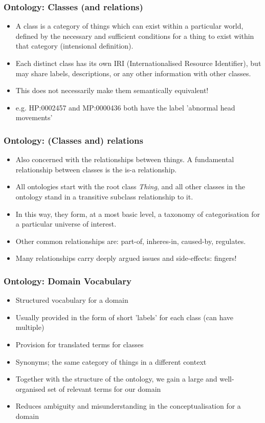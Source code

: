 \documentclass[aspectratio=169]{beamer} %
\begin{document}
\begin{frame}
\frametitle{Ontology: Classes (and relations)}
\begin{itemize}
  \item A class is a category of things which can exist within a
  particular world, defined by the necessary and sufficient conditions for a
  thing to exist within that category (intensional definition).
  \item Each distinct class has its own IRI (Internationalised Resource
  Identifier), but may share labels, descriptions, or any other information with
  other classes.
  \item This does not necessarily make them semantically equivalent!
  \item e.g. HP:0002457 and MP:0000436 both have the label 'abnormal head
  movements'
\end{itemize}
\end{frame}

\begin{frame}
\frametitle{Ontology: (Classes and) relations}
\begin{itemize}
  \item Also concerned with the relationships between things. A fundamental
  relationship between classes is the is-a relationship.
  \item All ontologies start with the root class \emph{Thing}, and all other 
  classes in the ontology stand in a transitive subclass relationship to it.
  \item In this way, they form, at a most basic level, a taxonomy of
  categorisation for a particular universe of interest.
  \item Other common relationships are: part-of, inheres-in, caused-by,
  regulates.
  \item Many relationships carry deeply argued issues and side-effects: fingers!
\end{itemize}
\end{frame}

\begin{frame}
\frametitle{Ontology: Domain Vocabulary}

\begin{itemize}
  \item Structured vocabulary for a domain
  \item Usually provided in the form of short 'labels' for each class (can have
  multiple)
  \item Provision for translated terms for classes
  \item Synonyms; the same category of things in a different context
  \item Together with the structure of the ontology, we gain a large and
  well-organised set of relevant terms for our domain
  \item Reduces ambiguity and misunderstanding in the conceptualisation for a
  domain
\end{itemize}
\end{frame}
\end{document}
